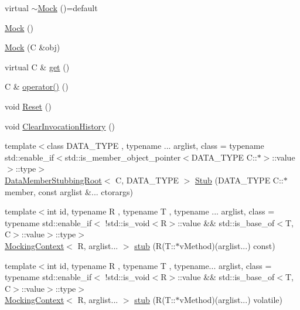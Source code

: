 \begin{DoxyCompactItemize}
\item 
virtual \mbox{\hyperlink{classfakeit_1_1Mock_af5ecff29779ab75289c260d0a56705ab}{$\sim$\+Mock}} ()=default
\item 
\mbox{\hyperlink{classfakeit_1_1Mock_af7a86c609a2ee704ee09de6db066c7f4}{Mock}} ()
\item 
\mbox{\hyperlink{classfakeit_1_1Mock_aa474a0d6c7447608253a0fc306eb6ef5}{Mock}} (C \&obj)
\item 
virtual C \& \mbox{\hyperlink{classfakeit_1_1Mock_a139a126982e65ed43a69b21a3a8a6d35}{get}} ()
\item 
C \& \mbox{\hyperlink{classfakeit_1_1Mock_a128ca35e5c7648e0612f017cb7076498}{operator()}} ()
\item 
void \mbox{\hyperlink{classfakeit_1_1Mock_a69c66fc56c032205843b05d91f339a55}{Reset}} ()
\item 
void \mbox{\hyperlink{classfakeit_1_1Mock_ac9e21ef9c73c735287c7fd3dd110aafc}{Clear\+Invocation\+History}} ()
\item 
{\footnotesize template$<$class D\+A\+T\+A\+\_\+\+T\+Y\+PE , typename ... arglist, class  = typename std\+::enable\+\_\+if$<$std\+::is\+\_\+member\+\_\+object\+\_\+pointer$<$\+D\+A\+T\+A\+\_\+\+T\+Y\+P\+E C\+::$\ast$$>$\+::value$>$\+::type$>$ }\\\mbox{\hyperlink{classfakeit_1_1DataMemberStubbingRoot}{Data\+Member\+Stubbing\+Root}}$<$ C, D\+A\+T\+A\+\_\+\+T\+Y\+PE $>$ \mbox{\hyperlink{classfakeit_1_1Mock_ae210824251ca071933f8a651bbe56047}{Stub}} (D\+A\+T\+A\+\_\+\+T\+Y\+PE C\+::$\ast$member, const arglist \&... ctorargs)
\item 
{\footnotesize template$<$int id, typename R , typename T , typename ... arglist, class  = typename std\+::enable\+\_\+if$<$                !std\+::is\+\_\+void$<$\+R$>$\+::value \&\& std\+::is\+\_\+base\+\_\+of$<$\+T, C$>$\+::value$>$\+::type$>$ }\\\mbox{\hyperlink{classfakeit_1_1MockingContext}{Mocking\+Context}}$<$ R, arglist... $>$ \mbox{\hyperlink{classfakeit_1_1Mock_a7a8f38b58b068b35f263eee42d75c162}{stub}} (R(T\+::$\ast$v\+Method)(arglist...) const)
\item 
{\footnotesize template$<$int id, typename R , typename T , typename... arglist, class  = typename std\+::enable\+\_\+if$<$                !std\+::is\+\_\+void$<$\+R$>$\+::value \&\& std\+::is\+\_\+base\+\_\+of$<$\+T, C$>$\+::value$>$\+::type$>$ }\\\mbox{\hyperlink{classfakeit_1_1MockingContext}{Mocking\+Context}}$<$ R, arglist... $>$ \mbox{\hyperlink{classfakeit_1_1Mock_a6974858200b57469de78bf2a06d6fa02}{stub}} (R(T\+::$\ast$v\+Method)(arglist...) volatile)

\end{DoxyCompactItemize}
